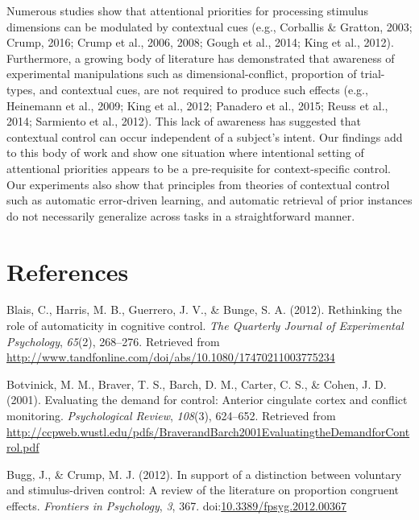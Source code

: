 \documentclass[english,,man,floatsintext]{apa6}
\begin{document}
Numerous studies show that attentional priorities for processing
stimulus dimensions can be modulated by contextual cues (e.g., Corballis
\& Gratton, 2003; Crump, 2016; Crump et al., 2006, 2008; Gough et al.,
2014; King et al., 2012). Furthermore, a growing body of literature has
demonstrated that awareness of experimental manipulations such as
dimensional-conflict, proportion of trial-types, and contextual cues,
are not required to produce such effects (e.g., Heinemann et al., 2009;
King et al., 2012; Panadero et al., 2015; Reuss et al., 2014; Sarmiento
et al., 2012). This lack of awareness has suggested that contextual
control can occur independent of a subject's intent. Our findings add to
this body of work and show one situation where intentional setting of
attentional priorities appears to be a pre-requisite for
context-specific control. Our experiments also show that principles from
theories of contextual control such as automatic error-driven learning,
and automatic retrieval of prior instances do not necessarily generalize
across tasks in a straightforward manner.

\newpage

\section{References}\label{references}

\begingroup
\setlength{\parindent}{-0.5in} \setlength{\leftskip}{0.5in}

\hypertarget{refs}{}
\hypertarget{ref-blais_rethinking_2012}{}
Blais, C., Harris, M. B., Guerrero, J. V., \& Bunge, S. A. (2012).
Rethinking the role of automaticity in cognitive control. \emph{The
Quarterly Journal of Experimental Psychology}, \emph{65}(2), 268--276.
Retrieved from
\url{http://www.tandfonline.com/doi/abs/10.1080/17470211003775234}

\hypertarget{ref-botvinick_evaluating_2001}{}
Botvinick, M. M., Braver, T. S., Barch, D. M., Carter, C. S., \& Cohen,
J. D. (2001). Evaluating the demand for control: Anterior cingulate
cortex and conflict monitoring. \emph{Psychological Review},
\emph{108}(3), 624--652. Retrieved from
\url{http://ccpweb.wustl.edu/pdfs/BraverandBarch2001EvaluatingtheDemandforControl.pdf}

\hypertarget{ref-bugg_support_2012}{}
Bugg, J., \& Crump, M. J. (2012). In support of a distinction between
voluntary and stimulus-driven control: A review of the literature on
proportion congruent effects. \emph{Frontiers in Psychology}, \emph{3},
367.
doi:\href{https://doi.org/10.3389/fpsyg.2012.00367}{10.3389/fpsyg.2012.00367}
\end{document}
